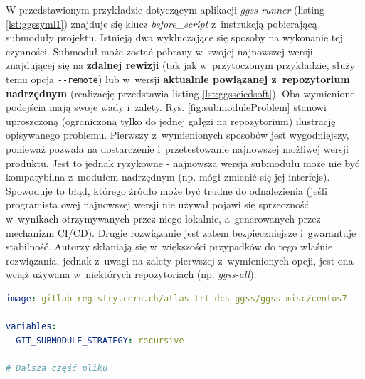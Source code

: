W przedstawionym przykładzie dotyczącym aplikacji \textit{ggss-runner} (listing \ref{lst:ggssyml1}) znajduje się klucz \textit{before\_script} z~instrukcją pobierającą submoduły projektu. Istnieją dwa wykluczające się sposoby na wykonanie tej czynności. Submoduł może zostać pobrany w~swojej najnowszej wersji znajdującej się na \textbf{zdalnej rewizji} (tak jak w~przytoczonym przykładzie, służy temu opcja \lstinline{--remote}) lub w~wersji \textbf{aktualnie powiązanej z~repozytorium nadrzędnym} (realizację przedstawia listing \ref{lst:ggsscicdsoft}). Oba wymienione podejścia mają swoje wady i~zalety. Rys. \ref{fig:submoduleProblem} stanowi uproszczoną (ograniczoną tylko do jednej gałęzi na repozytorium) ilustrację opisywanego problemu. Pierwszy z~wymienionych sposobów jest wygodniejszy, ponieważ pozwala na dostarczenie i~przetestowanie najnowszej możliwej wersji produktu. Jest to jednak ryzykowne - najnowsza wersja submodułu może nie być kompatybilna z~modułem nadrzędnym (np. mógł zmienić się jej interfejs). Spowoduje to błąd, którego źródło może być trudne do odnalezienia (jeśli programista owej najnowszej wersji nie używał pojawi się sprzeczność w~wynikach otrzymywanych przez niego lokalnie, a~generowanych przez mechanizm CI/CD). Drugie rozwiązanie jest zatem bezpieczniejsze i~gwarantuje stabilność. Autorzy skłaniają się w~większości przypadków do tego właśnie rozwiązania, jednak z~uwagi na zalety pierwszej z~wymienionych opcji, jest ona wciąż używana w~niektórych repozytoriach (np. \textit{ggss-all}). 

\begin{lstlisting}[language=yaml,caption={Fragment pliku \textit{.gitlab-ci.yml} znajdującego się w~repozytorium \textit{ggss-software-libs} pobierający submoduły projektu w~wersji aktualnie powiązanej z~repozytorium nadrzędnym}, label={lst:ggsscicdsoft}]
image: gitlab-registry.cern.ch/atlas-trt-dcs-ggss/ggss-misc/centos7

variables:
  GIT_SUBMODULE_STRATEGY: recursive

# Dalsza część pliku

\end{lstlisting}

